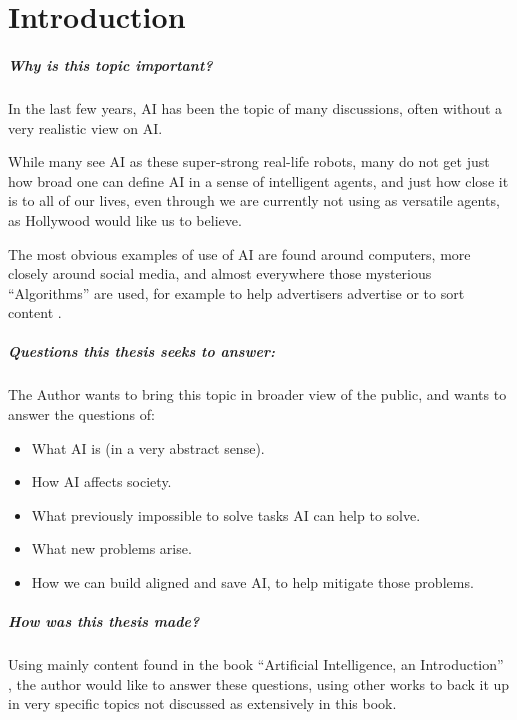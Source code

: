 \chapter{Introduction}
\paragraph{Why is this topic important?}
In the last few years, AI has been the topic of many discussions, often without a very realistic view on AI.

While many see AI as these super-strong real-life robots, many do not get just how broad one can define AI in a sense of intelligent agents, and just how close it is to all of our lives, even through we are currently not using as versatile agents, as Hollywood would like us to believe.

The most obvious examples of use of AI are found around computers, more closely around social media, and almost everywhere those mysterious “Algorithms” are used, for example to help advertisers advertise \cite{facebookWerbungAufInstagram} or to sort content \cite{googleFunktioniertGoogleSucheSuchalgorithmen}.
\paragraph{Questions this thesis seeks to answer:}
The Author wants to bring this topic in broader view of the public, and wants to answer the questions of: 
\begin{itemize}
    \item What AI is (in a very abstract sense).
    \item How AI affects society.
    \item What previously impossible to solve tasks AI can help to solve.
    \item What new problems arise.
    \item How we can build aligned and save AI, to help mitigate those problems.
\end{itemize}
\paragraph{How was this thesis made?}
Using mainly content found in the book “Artificial Intelligence, an Introduction” \cite{russellArtificialIntelligenceModern2010}, the author would like to answer these questions, using other works to back it up in very specific topics not discussed as extensively in this book.